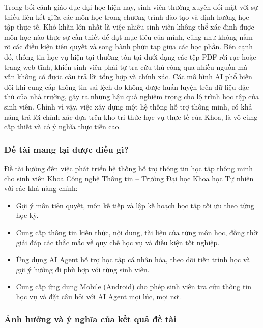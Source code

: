 \begin{refsection}
Trong bối cảnh giáo dục đại học hiện nay, sinh viên thường xuyên đối mặt với sự thiếu liên kết giữa các môn học trong chương trình đào tạo và định hướng học tập thực tế. Khó khăn lớn nhất là việc nhiều sinh viên không thể xác định được môn học nào thực sự cần thiết để đạt mục tiêu của mình, cũng như không nắm rõ các điều kiện tiên quyết và song hành phức tạp giữa các học phần. Bên cạnh đó, thông tin học vụ hiện tại thường tồn tại dưới dạng các tệp PDF rời rạc hoặc trang web tĩnh, khiến sinh viên phải tự tra cứu thủ công qua nhiều nguồn mà vẫn không có được câu trả lời tổng hợp và chính xác. Các mô hình AI phổ biến đôi khi cung cấp thông tin sai lệch do không được huấn luyện trên dữ liệu đặc thù của nhà trường, gây ra những hậu quả nghiêm trọng cho lộ trình học tập của sinh viên. Chính vì vậy, việc xây dựng một hệ thống hỗ trợ thông minh, có khả năng trả lời chính xác dựa trên kho tri thức học vụ thực tế của Khoa, là vô cùng cấp thiết và có ý nghĩa thực tiễn cao.

\subsubsection*{\thepropsubsubsec\quad Đề tài mang lại được điều gì?}

Đề tài hướng đến việc phát triển hệ thống hỗ trợ thông tin học tập thông minh cho sinh viên Khoa Công nghệ Thông tin -- Trường Đại học Khoa học Tự nhiên với các khả năng chính:

\begin{itemize}[label={--}, leftmargin=1.5em]
    \item Gợi ý môn tiên quyết, môn kế tiếp và lập kế hoạch học tập tối ưu theo từng học kỳ.
    \item Cung cấp thông tin kiến thức, nội dung, tài liệu của từng môn học, đồng thời giải đáp các thắc mắc về quy chế học vụ và điều kiện tốt nghiệp.
    \item Ứng dụng AI Agent hỗ trợ học tập cá nhân hóa, theo dõi tiến trình học và gợi ý hướng đi phù hợp với từng sinh viên.
    \item Cung cấp ứng dụng Mobile (Android) cho phép sinh viên tra cứu thông tin học vụ và đặt câu hỏi với AI Agent mọi lúc, mọi nơi.
\end{itemize}

\subsubsection*{\thepropsubsubsec\quad Ảnh hưởng và ý nghĩa của kết quả đề tài}


\end{refsection}
